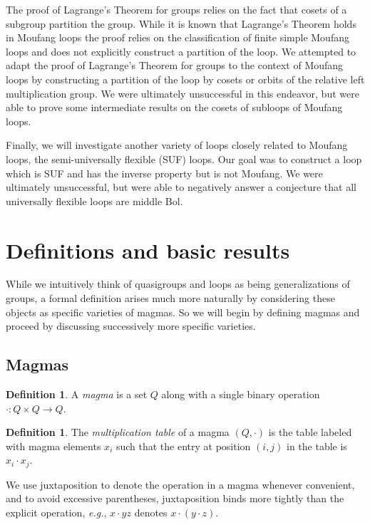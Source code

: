 \documentclass[12pt]{report}
\theoremstyle{definition}
\newtheorem{dfn}[thm]{Definition}
\begin{document}
The proof of Lagrange's Theorem for groups relies on the fact that cosets of a subgroup partition the group. While it is
  known that Lagrange's Theorem holds in Moufang loops the proof relies on the classification of finite simple Moufang
  loops and does not explicitly construct a partition of the loop. We attempted to adapt the proof of Lagrange's Theorem
  for groups to the context of Moufang loops by constructing a partition of the loop by cosets or orbits of the relative
  left multiplication group. We were ultimately unsuccessful in this endeavor, but were able to prove some intermediate
  results on the cosets of subloops of Moufang loops.

Finally, we will investigate another variety of loops closely related to Moufang loops, the semi-universally flexible (SUF)
  loops. Our goal was to construct a loop which is SUF and has the inverse property but is not Moufang. We were ultimately
  unsuccessful, but were able to negatively answer a conjecture that all universally flexible loops are middle Bol.

\section{Definitions and basic results}

While we intuitively think of quasigroups and loops as being generalizations of groups, a formal definition arises much more
  naturally by considering these objects as specific varieties of magmas. So we will begin by defining magmas and proceed
  by discussing successively more specific varieties.

\subsection{Magmas}

\begin{dfn}
  A \emph{magma} is a set $Q$ along with a single binary operation $\cdot: Q\times Q\to Q$.
\end{dfn}

\begin{dfn}
  The \emph{multiplication table} of a magma $(Q, \cdot)$ is the table labeled with magma elements $x_i$ such that
    the entry at position $(i, j)$ in the table is $x_i\cdot x_j$.
\end{dfn}

We use juxtaposition to denote the operation in a magma whenever convenient, and to avoid excessive parentheses,
  juxtaposition binds more tightly than the explicit operation, \emph{e.g.}, $x\cdot yz$ denotes $x\cdot (y\cdot z)$.
\end{document}
